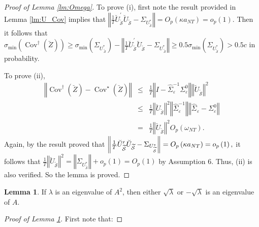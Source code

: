 ﻿\documentclass[12pt]{article}
\newcommand{\0}{\mbox{\bf 0}}
\theoremstyle{plain}%
\newtheorem{lemma}[theorem]{Lemma}
\theoremstyle{definition}
\newtheorem{lemma}[theorem]{Lemma}
\DeclareMathOperator{\Cov}{Cov}
\begin{document}
{\begin{proof}[Proof of Lemma \protect\ref{lm:Omega}]
To prove (i), first note the result provided in Lemma \ref{lm:U_Cov} implies
that $\left\Vert \frac{1}{T} \breve{U}_{{\widetilde{\mathcal{S}}}}^{\prime } 
\breve{U}_{{\widetilde{ \mathcal{S}}}}-\Sigma _{U_{{\widetilde{\mathcal{S}}}
}^{\ast }}\right\Vert = O_{p}\left( \kappa a_{NT}\right) =o_{p}\left(
1\right) .$ Then it follows that $\sigma _{\min }\left( \Cov^{\dagger
}\left( \breve{Z}\right) \right) \geq \sigma _{\min }\left( \Sigma _{U_{{\ 
\widetilde{ \mathcal{S}}}}^{\ast }}\right) -\left\Vert \frac{1}{T}\breve{U}%
_{ {\widetilde{ \mathcal{S}}}}^{\prime }\breve{U}_{{\widetilde{\mathcal{S}}}
}-\Sigma _{U_{{\ \widetilde{\mathcal{S}}}}^{\ast }}\right\Vert \geq
0.5\sigma _{\min }\left( \Sigma _{U_{{\widetilde{\mathcal{S}}}}^{\ast
}}\right) > 0.5c $ in probability.

To prove (ii), 
\begin{eqnarray*}
\left\Vert \Cov^{\dagger }\left( \breve{Z}\right) -\Cov^{\star }\left( 
\breve{Z }\right) \right\Vert &\leq &\frac{1}{T}\left\Vert I-\widehat{\Sigma 
} _{\varepsilon }^{-1}\Sigma _{\varepsilon }^{0}\right\Vert \left\Vert 
\breve{U }_{{\widetilde{\mathcal{S}}}}\right\Vert ^{2} \\
&\leq &\frac{1}{T}\left\Vert \breve{U}_{{\widetilde{\mathcal{S}}}
}\right\Vert ^{2}\left\Vert \widehat{\Sigma }_{\varepsilon }^{-1}\right\Vert
\left\Vert \widehat{\Sigma }_{\varepsilon }-\Sigma _{\varepsilon
}^{0}\right\Vert \\
&=&\frac{1}{T}\left\Vert \breve{U}_{{\widetilde{\mathcal{S}}}}\right\Vert
^{2}O_{p}\left( \omega _{NT}\right) .
\end{eqnarray*}
Again, by the result proved that $\left\Vert \frac{1}{T}\breve{U}_{{%
\widetilde{\mathcal{S}}}}^{\prime }\breve{U}_{{\widetilde{\mathcal{S}}}
}-\Sigma _{U_{{\widetilde{\mathcal{S}}}}^{\ast }}\right\Vert =O_{p}\left(
\kappa a_{NT}\right) =o_{p}\left( 1\right) ,$ it follows that $\frac{1}{T}
\left\Vert \breve{U}_{{\widetilde{\mathcal{S}}}}\right\Vert ^{2}=\left\Vert
\Sigma _{U_{{\widetilde{\mathcal{S}}}}^{\ast }}\right\Vert +o_{p}\left(
1\right) =O_{p}\left( 1\right)$ by Assumption 6. Thus,
(ii) is also verified. So the lemma is proved.
\end{proof}

\begin{lemma}
\label{lm:sq_eigen} If $\lambda$ is an eigenvalue of $A^2$, then either $%
\sqrt{\lambda}$ or $-\sqrt{\lambda}$ is an eigenvalue of $A$.
\end{lemma}

\begin{proof}[Proof of Lemma \protect\ref{lm:sq_eigen}]
First note that:


\end{proof}}
\end{document}
